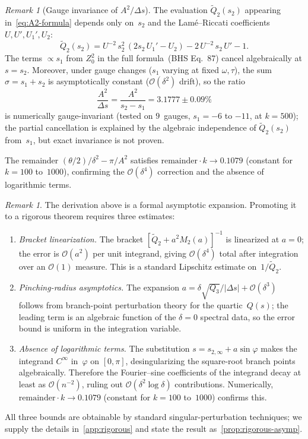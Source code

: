 \documentclass[11pt,a4paper]{article}
\theoremstyle{plain}
\theoremstyle{definition}
\theoremstyle{remark}
\newtheorem{remark}[theorem]{Remark}
\newcommand{\Oo}{\mathcal{O}}
\begin{document}
\begin{remark}[Gauge invariance of $A^2/\Delta s$]\label{obs:gauge-invariant}
  The evaluation $\tilde Q_2(s_2)$ appearing in~\eqref{eq:A2-formula}
  depends only on~$s_2$ and the Lam\'e--Riccati coefficients
  $U, U', U_1', U_2$:
  \[
    \tilde Q_2(s_2) = U^{-2}\,s_2^2\,(2s_2\,U_1' - U_2)
      - 2\,U^{-2}\,s_2\,U' - 1.
  \]
  The terms $\propto s_1$ from $Z_0^2$ in the full
  formula~\textup{(BHS Eq.~87)} cancel algebraically at $s = s_2$.
  Moreover, under gauge changes ($s_1$ varying at fixed $\omega, \tau$),
  the sum $\sigma = s_1 + s_2$ is asymptotically constant ($\Oo(\delta^2)$
  drift), so the ratio
  \[
    \frac{A^2}{\Delta s} = \frac{A^2}{s_2 - s_1}
    = 3.1777 \pm 0.09\%
  \]
  is numerically gauge-invariant (tested on $9$~gauges,
  $s_1 = -6$ to $-11$, at $k = 500$);
  the partial cancellation is explained by
  the algebraic independence of $\tilde Q_2(s_2)$
  from~$s_1$, but exact invariance is not proven.
\end{remark}

The remainder $(\theta/2)/\delta^2 - \pi/A^2$ satisfies
$\mathrm{remainder}\cdot k \to 0.1079$ (constant for $k = 100$
to~$1000$), confirming the $\Oo(\delta^4)$ correction and the absence
of logarithmic terms.

\begin{remark}\label{rem:rigour-path}
  The derivation above is a formal asymptotic expansion.  Promoting
  it to a rigorous theorem requires three estimates:
  \begin{enumerate}[nosep,label=(\alph*)]
  \item \emph{Bracket linearization.}  The bracket
    $[\tilde Q_2 + a^2 M_2(a)]^{-1}$ is linearized at $a=0$;
    the error is $\Oo(a^2)$ per unit integrand, giving $\Oo(\delta^4)$
    total after integration over an $\Oo(1)$ measure.  This is a
    standard Lipschitz estimate on~$1/\tilde Q_2$.
  \item \emph{Pinching-radius asymptotics.}  The expansion
    $a = \delta\sqrt{Q_3}/|\Delta s| + \Oo(\delta^3)$ follows from
    branch-point perturbation theory for the quartic~$Q(s)$; the
    leading term is an algebraic function of the $\delta=0$ spectral
    data, so the error bound is uniform in the integration variable.
  \item \emph{Absence of logarithmic terms.}  The substitution
    $s = s_{2,\infty} + a\sin\varphi$ makes the integrand $C^\infty$
    in~$\varphi$ on $[0,\pi]$, desingularizing the square-root
    branch points algebraically.  Therefore
    the Fourier--sine coefficients of the integrand decay at least as
    $\Oo(n^{-2})$, ruling out $\Oo(\delta^2\log\delta)$ contributions.
    Numerically, $\mathrm{remainder}\cdot k \to 0.1079$ (constant
    for $k = 100$ to~$1000$) confirms this.
  \end{enumerate}
  All three bounds are obtainable by standard singular-perturbation
  techniques; we supply the details in~\cref{app:rigorous} and
  state the result as~\cref{prop:rigorous-asymp}.
\end{remark}
\end{document}
